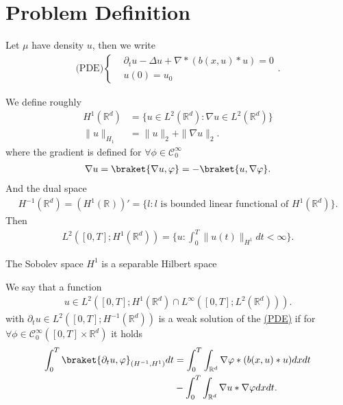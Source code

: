 \section{Problem Definition}
\begin{definition}\label{weak_pde_mve}
  Let $\mu $ have density $u$, then we write 
  \begin{align*}
    \text{(PDE)}\begin{cases}
    &\partial_t u  - \Delta u  + \nabla * (b(x,u)*u )  =0\\
    &u(0) = u_0
  \end{cases}
.\end{align*}
\end{definition}
\begin{definition}
 We define roughly  
 \begin{align*}
   H^1(\mathbb{R}^{d} ) &= \{u \in  L^2(\mathbb{R}^{d})  :  \nabla u \in  L^2(\mathbb{R}^{d}) \}  \\
   \|u\|_{H_{1}} &= \|u\|_2 + \|\nabla u\|_2
 .\end{align*}
 where the gradient is defined for $\forall  \phi \in  \mathcal{C}_0^{\infty} $ 
 \begin{align*}
   \nabla u = \braket{\nabla u , \phi } = -\braket{u,\nabla \phi }
 .\end{align*}
 And the dual space
 \begin{align*}
  H^{-1}(\mathbb{R}^{d} )  =  (H^{1}(\mathbb{R}^{} ) )' =  \{l : l\text{ is bounded linear functional of } H^{1}(\mathbb{R}^{d} )  \}  
 .\end{align*}
 Then  
 \begin{align*}
   L^2([0,T];H^{1}(\mathbb{R}^{d} ) ) = \{u : \int_0^{T} \|u(t)\|_{H^1} dt < \infty \}  
 .\end{align*}
\end{definition}
\begin{remark}
 The Sobolev space $H^1$ is a separable Hilbert space 
\end{remark}
\begin{definition}
  We say that a function 
  \begin{align*}
    u \in  L^2([0,T];H^{1}(\mathbb{R}^{d} )\cap L^{\infty}([0,T];L^2(\mathbb{R}^{d} ))  )
  .\end{align*}
  with $\partial_t u \in  L^2([0,T];H^{-1}(\mathbb{R}^{d} ))$ is a weak solution of the \hyperref[weak_pde_mve]{(PDE)} if for
  $\forall  \phi  \in \mathcal{C}^{\infty}_0([0,T]\times \mathbb{R}^{d} )  $ it holds 
  \begin{align*}
    \int_0^{T} \braket{\partial_t u , \phi }_{(H^{-1},H^{1})} dt &= \int_0^{T} \int_{\mathbb{R}^{d} }  \nabla \phi * (b(x,u)*u) dx dt \\
                                                                 &- \int_0^{T} \int_{\mathbb{R}^{d} }  \nabla u * \nabla \phi  dx dt
  .\end{align*} 
\end{definition}
